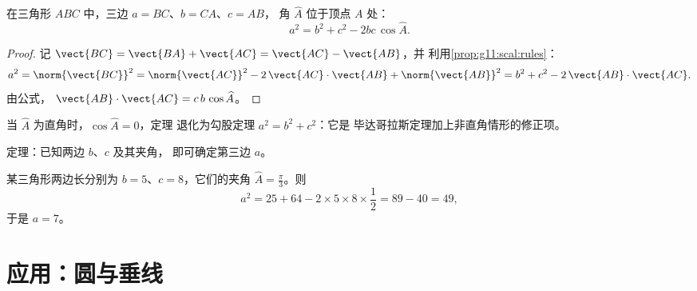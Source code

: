\begin{theorem}[余弦定理]\label{thm:g11:scal:cosines}
在三角形 $ABC$ 中，三边 $a = BC$、$b = CA$、$c = AB$，
角 $\widehat A$ 位于顶点 $A$ 处：
\[
a^2 = b^2 + c^2 - 2bc\,\cos\widehat A .
\]
\end{theorem}

\begin{proof}
记 $\vect{BC} = \vect{BA} + \vect{AC} = \vect{AC} - \vect{AB}$，并
利用\cref{prop:g11:scal:rules}：
\[
a^2 = \norm{\vect{BC}}^2
= \norm{\vect{AC}}^2 - 2\,\vect{AC}\cdot\vect{AB} + \norm{\vect{AB}}^2
= b^2 + c^2 - 2\,\vect{AB}\cdot\vect{AC}.
\]
由公式，
$\vect{AB}\cdot\vect{AC} = c\,b\,\cos\widehat A$。
\end{proof}

\begin{remark}
当 $\widehat A$ 为直角时，$\cos\widehat A = 0$，定理
退化为勾股定理 $a^2 = b^2 + c^2$：它是
毕达哥拉斯定理加上非直角情形的修正项。
\end{remark}

\begin{omfigure}

{\small {}定理：已知两边 $b$、$c$ 及其夹角，
即可确定第三边 $a$。}
\end{omfigure}

\begin{example}\label{ex:g11:scal:cosines}
某三角形两边长分别为 $b = 5$、$c = 8$，它们的夹角
$\widehat A = \frac\pi3$。则
\[
a^2 = 25 + 64 - 2 \times 5 \times 8 \times \frac12 = 89 - 40 = 49,
\]
于是 $a = 7$。
\end{example}

\section{应用：圆与垂线}


